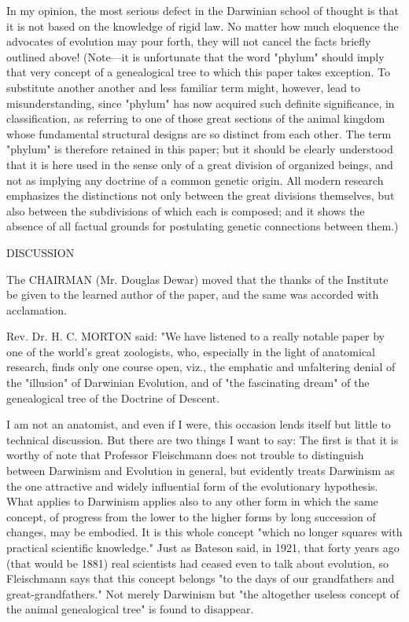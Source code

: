 In my opinion, the most serious defect in the Darwinian school of thought is that it is not
based on the knowledge of rigid law. No matter how much eloquence the advocates of
evolution may pour forth, they will not cancel the facts briefly outlined above!
(Note—it is unfortunate that the word "phylum" should imply that very concept of a
genealogical tree to which this paper takes exception. To substitute another another and less
familiar term might, however, lead to misunderstanding, since "phylum" has now acquired
such definite significance, in classification, as referring to one of those great sections of the
animal kingdom whose fundamental structural designs are so distinct from each other. The
term "phylum" is therefore retained in this paper; but it should be clearly understood that it is
here used in the sense only of a great division of organized beings, and not as implying any
doctrine of a common genetic origin. All modern research emphasizes the distinctions not
only between the great divisions themselves, but also between the subdivisions of which each
is composed; and it shows the absence of all factual grounds for postulating genetic
connections between them.)

DISCUSSION

The CHAIRMAN (Mr. Douglas Dewar) moved that the thanks of the Institute be given to the
learned author of the paper, and the same was accorded with acclamation.

Rev. Dr. H. C. MORTON said: "We have listened to a really notable paper by one of the
world's great zoologists, who, especially in the light of anatomical research, finds only one
course open, viz., the emphatic and unfaltering denial of the "illusion" of Darwinian
Evolution, and of "the fascinating dream" of the genealogical tree of the Doctrine of Descent.

I am not an anatomist, and even if I were, this occasion lends itself but little to technical
discussion. But there are two things I want to say: The first is that it is worthy of note that
Professor Fleischmann does not trouble to distinguish between Darwinism and Evolution in
general, but evidently treats Darwinism as the one attractive and widely influential form of
the evolutionary hypothesis. What applies to Darwinism applies also to any other form in
which the same concept, of progress from the lower to the higher forms by long succession
of changes, may be embodied. It is this whole concept "which no longer squares with
practical scientific knowledge." Just as Bateson said, in 1921, that forty years ago (that would
be 1881) real scientists had ceased even to talk about evolution, so Fleischmann says that this
concept belongs "to the days of our grandfathers and great-grandfathers." Not merely
Darwinism but "the altogether useless concept of the animal genealogical tree" is found to
disappear.

